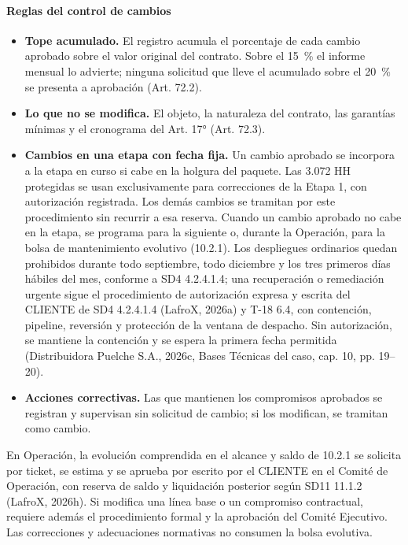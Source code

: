 \documentclass[carta,firma,final]{lafrox}
\begin{document}
\paragraph{Reglas del control de cambios}
\begin{itemize}
  \item \textbf{Tope acumulado.} El registro acumula el porcentaje de cada cambio aprobado sobre el valor original del contrato. Sobre el 15~\% el informe mensual lo advierte; ninguna solicitud que lleve el acumulado sobre el 20~\% se presenta a aprobación (Art. 72.2).
  \item \textbf{Lo que no se modifica.} El objeto, la naturaleza del contrato, las garantías mínimas y el cronograma del Art. 17° (Art. 72.3).
  \item \textbf{Cambios en una etapa con fecha fija.} Un cambio aprobado se incorpora a la etapa en curso si cabe en la holgura del paquete. Las 3.072 HH protegidas se usan exclusivamente para correcciones de la Etapa 1, con autorización registrada. Los demás cambios se tramitan por este procedimiento sin recurrir a esa reserva. Cuando un cambio aprobado no cabe en la etapa, se programa para la siguiente o, durante la Operación, para la bolsa de mantenimiento evolutivo (10.2.1). Los despliegues ordinarios quedan prohibidos durante todo septiembre, todo diciembre y los tres primeros días hábiles del mes, conforme a SD4 4.2.4.1.4; una recuperación o remediación urgente sigue el procedimiento de autorización expresa y escrita del CLIENTE de SD4 4.2.4.1.4 (LafroX, 2026a) y T-18 6.4, con contención, pipeline, reversión y protección de la ventana de despacho. Sin autorización, se mantiene la contención y se espera la primera fecha permitida (Distribuidora Puelche S.A., 2026c, Bases Técnicas del caso, cap. 10, pp. 19--20).
  \item \textbf{Acciones correctivas.} Las que mantienen los compromisos aprobados se registran y supervisan sin solicitud de cambio; si los modifican, se tramitan como cambio.
\end{itemize}

En Operación, la evolución comprendida en el alcance y saldo de 10.2.1 se solicita por ticket, se estima y se aprueba por escrito por el CLIENTE en el Comité de Operación, con reserva de saldo y liquidación posterior según SD11 11.1.2 (LafroX, 2026h). Si modifica una línea base o un compromiso contractual, requiere además el procedimiento formal y la aprobación del Comité Ejecutivo. Las correcciones y adecuaciones normativas no consumen la bolsa evolutiva.
\end{document}
